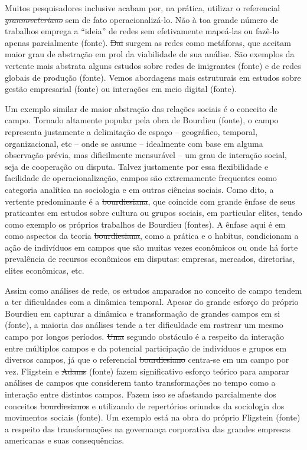 Muitos pesquisadores inclusive acabam por, na prática, utilizar o referencial \emph{\sout{grannoveteriano}} sem de fato operacionalizá-lo. Não à toa
grande número de trabalhos emprega a ``ideia'' de redes sem efetivamente
mapeá-las ou fazê-lo apenas parcialmente (fonte). \sout{Dai} surgem as redes
como metáforas, que aceitam maior grau de abstração em prol da viabilidade de sua análise. São exemplos da vertente mais abstrata alguns estudos sobre redes de imigrantes (fonte) e de redes globais de produção (fonte). Vemos abordagens mais estruturais em estudos sobre gestão empresarial (fonte) ou interações em meio digital (fonte).

Um exemplo similar de maior abstração das relações sociais é o conceito de campo. Tornado altamente popular pela obra de Bourdieu (fonte), o campo representa justamente a delimitação de espaço -- geográfico, temporal, organizacional, etc -- onde se assume -- idealmente com base em alguma observação prévia, mas dificilmente mensurável -- um grau
de interação social, seja de cooperação ou disputa. Talvez justamente por essa flexibilidade e facilidade de operacionalização, campos são extremamente
frequentes como categoria analítica na sociologia e em outras ciências sociais. Como dito, a
vertente predominante é a \sout{bourdiesiana}, que coincide com grande ênfase
de seus praticantes em estudos sobre cultura ou grupos sociais, em
particular elites, tendo como exemplo os próprios trabalhos de Bourdieu (fontes). A ênfase aqui é em como aspectos da teoria \sout{bourdiesiana}, como a prática e o habitus, condicionam a ação de indivíduos em campos que são muitas vezes econômicos ou onde há forte prevalência de recursos econômicos em disputas: empresas, mercados, diretorias, elites econômicas, etc.

Assim como análises de rede, os estudos amparados no conceito de campo
tendem a ter dificuldades com a dinâmica temporal. Apesar do grande
esforço do próprio Bourdieu em capturar a dinâmica e transformação
de grandes campos em si (fonte), a maioria das análises tende
a ter dificuldade em rastrear um mesmo campo por longos períodos. \sout{Uma} segundo obstáculo é a respeito da interação entre múltiplos campos e da potencial participação de indivíduos e grupos em diversos campos, já que o referencial \sout{bourdiesiano} centra-se em um campo por vez. Fligstein e \sout{Adams} (fonte) fazem significativo esforço teórico para amparar análises de campos que considerem tanto transformações no tempo como a interação entre distintos campos. Fazem isso se 
afastando parcialmente dos conceitos \sout{bourdiesianos} e 
utilizando de repertórios oriundos da sociologia dos movimentos sociais (fonte). Um exemplo está na obra do próprio Fligstein (fonte) a respeito das transformações na governança corporativa das grandes empresas americanas e suas consequências.


